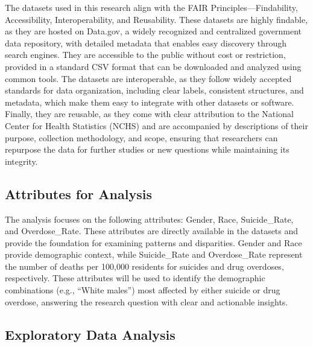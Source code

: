 \documentclass[
  letterpaper,
  DIV=11,
  numbers=noendperiod]{scrartcl}
\begin{document}
The datasets used in this research align with the FAIR
Principles---Findability, Accessibility, Interoperability, and
Reusability. These datasets are highly findable, as they are hosted on
Data.gov, a widely recognized and centralized government data
repository, with detailed metadata that enables easy discovery through
search engines. They are accessible to the public without cost or
restriction, provided in a standard CSV format that can be downloaded
and analyzed using common tools. The datasets are interoperable, as they
follow widely accepted standards for data organization, including clear
labels, consistent structures, and metadata, which make them easy to
integrate with other datasets or software. Finally, they are reusable,
as they come with clear attribution to the National Center for Health
Statistics (NCHS) and are accompanied by descriptions of their purpose,
collection methodology, and scope, ensuring that researchers can
repurpose the data for further studies or new questions while
maintaining its integrity.

\subsection{Attributes for Analysis}\label{attributes-for-analysis}

The analysis focuses on the following attributes: Gender, Race,
Suicide\_Rate, and Overdose\_Rate. These attributes are directly
available in the datasets and provide the foundation for examining
patterns and disparities. Gender and Race provide demographic context,
while Suicide\_Rate and Overdose\_Rate represent the number of deaths
per 100,000 residents for suicides and drug overdoses, respectively.
These attributes will be used to identify the demographic combinations
(e.g., ``White males'') most affected by either suicide or drug
overdose, answering the research question with clear and actionable
insights.

\subsection{Exploratory Data Analysis}\label{exploratory-data-analysis}
\end{document}
